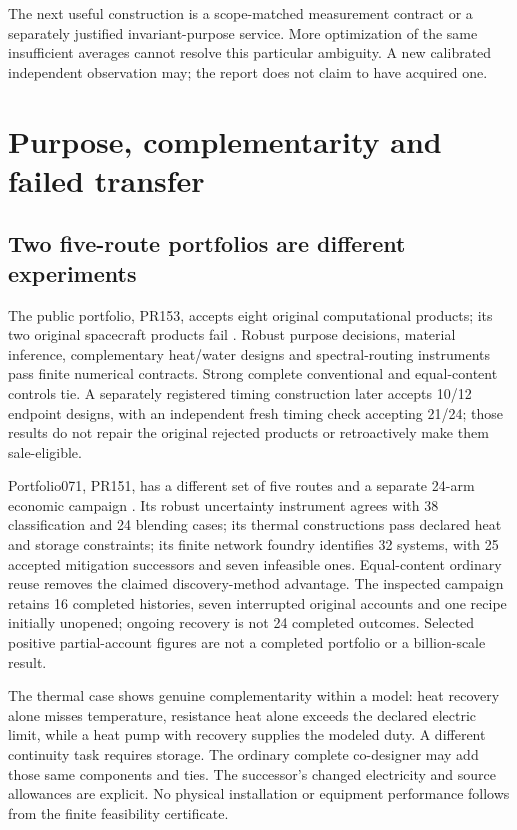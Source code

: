 \documentclass[11pt,letterpaper]{article}
\begin{document}
The next useful construction is a scope-matched measurement contract or a separately justified invariant-purpose service. More optimization of the same insufficient averages cannot resolve this particular ambiguity. A new calibrated independent observation may; the report does not claim to have acquired one.

\section{Purpose, complementarity and failed transfer}
\subsection{Two five-route portfolios are different experiments}
The public portfolio, PR153, accepts eight original computational products; its two original spacecraft products fail \cite{portfolio153}. Robust purpose decisions, material inference, complementary heat/water designs and spectral-routing instruments pass finite numerical contracts. Strong complete conventional and equal-content controls tie. A separately registered timing construction later accepts 10/12 endpoint designs, with an independent fresh timing check accepting 21/24; those results do not repair the original rejected products or retroactively make them sale-eligible.

Portfolio071, PR151, has a different set of five routes and a separate 24-arm economic campaign \cite{portfolio151}. Its robust uncertainty instrument agrees with 38 classification and 24 blending cases; its thermal constructions pass declared heat and storage constraints; its finite network foundry identifies 32 systems, with 25 accepted mitigation successors and seven infeasible ones. Equal-content ordinary reuse removes the claimed discovery-method advantage. The inspected campaign retains 16 completed histories, seven interrupted original accounts and one recipe initially unopened; ongoing recovery is not 24 completed outcomes. Selected positive partial-account figures are not a completed portfolio or a billion-scale result.

The thermal case shows genuine complementarity within a model: heat recovery alone misses temperature, resistance heat alone exceeds the declared electric limit, while a heat pump with recovery supplies the modeled duty. A different continuity task requires storage. The ordinary complete co-designer may add those same components and ties. The successor's changed electricity and source allowances are explicit. No physical installation or equipment performance follows from the finite feasibility certificate.
\end{document}

